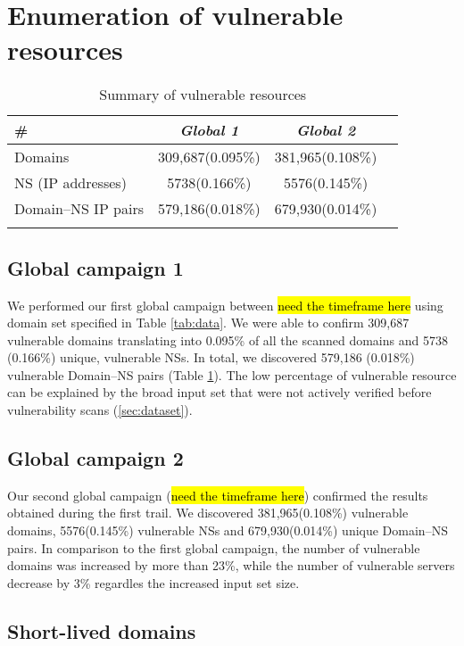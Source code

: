 \section{Enumeration of vulnerable resources}

\begin{table}
  \caption{Summary of vulnerable resources \label{tab:vulnerable}}
 \centering
\begin{tabular}{l*{3}{c}}
\Xhline{2\arrayrulewidth}
\#  & \textbf{\textit{Global 1}} & \textbf{\textit{Global 2}} \\
\hline
Domains & 309,687(0.095\%) & 381,965(0.108\%) \\
NS (IP addresses) & 5738(0.166\%) & 5576(0.145\%) \\
Domain--NS IP pairs & 579,186(0.018\%) & 679,930(0.014\%) \\
\Xhline{2\arrayrulewidth}
 \end{tabular}
\end{table}


\subsection{Global campaign 1}
We performed our first global campaign between \hl{need the timeframe here} using domain set specified in Table \ref{tab:data}. We were able to confirm 309,687 vulnerable domains translating into 0.095\% of all the scanned domains and 5738 (0.166\%) unique, vulnerable NSs. In total, we discovered  579,186 (0.018\%) vulnerable Domain--NS pairs (Table \ref{tab:vulnerable}). The low percentage of vulnerable resource can be explained by the broad input set that were not actively verified before vulnerability scans (\ref{sec:dataset}). 

\subsection{Global campaign 2}
Our second global campaign (\hl{need the timeframe here}) confirmed the results obtained during the first trail. We discovered 381,965(0.108\%) vulnerable domains, 5576(0.145\%) vulnerable NSs and 679,930(0.014\%) unique Domain--NS pairs. In comparison to the first global campaign, the number of vulnerable domains was increased by more than 23\%, while the number of vulnerable servers decrease by 3\% regardles the increased input set size. 


\subsection{Short-lived domains}
